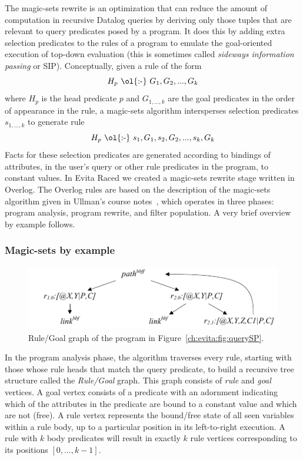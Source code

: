 The magic-sets rewrite is an optimization that can reduce the amount of computation in 
recursive Datalog queries by deriving only those tuples that are relevant to query predicates 
posed by a program. It does this by adding extra selection predicates to the rules of a program 
to emulate the goal-oriented execution of top-down evaluation (this is sometimes called 
\emph{sideways information passing} or SIP). Conceptually, given a rule of the form
\[
H_p \ \text{\ol{:-}}\  G_1, G_2, ..., G_k
\]
where $H_p$ is the head predicate $p$ and $G_{1,...,k}$ are the goal
predicates in the order of appearance in the rule, a magic-sets
algorithm intersperses selection predicates $s_{1,...,k}$ to generate rule
\[
H_p \ \text{\ol{:-}}\  s_1, G_1, s_2, G_2, ..., s_{k}, G_k
\]
Facts for these selection predicates are generated according to bindings of
attributes, in the user's query or other rule predicates in the program, to
constant values. In Evita Raced we created a magic-sets rewrite stage written in
Overlog. The Overlog rules are based on the description of the magic-sets algorithm
given in Ullman's course notes~\cite{ullmanNotes}, which operates in three phases: program analysis,
program rewrite, and filter population. A very brief overview by example follows.

\subsubsection{Magic-sets by example}

\begin{figure}[!t]
\begin{center}
\includegraphics[scale=1.8]{figures/RuleGoalGraph}
\caption{Rule/Goal graph of the program in Figure~\ref{ch:evita:fig:querySP}.}
\label{ch:evita:fig:rggraph}
\end{center}
\end{figure}

In the program analysis phase, the algorithm traverses every rule,
starting with those whose rule heads that match the query predicate, to build
a recursive tree structure called the {\em Rule/Goal} graph. This graph consists 
of \emph{rule} and \emph{goal} vertices.  A goal vertex consists of a predicate 
with an adornment indicating which of the attributes in the predicate are bound 
to a constant value and which are not (free).  A rule vertex represents the bound/free 
state of all seen variables within a rule body, up to a particular position in its left-to-right 
execution. A rule with $k$ body predicates will result in exactly $k$ rule vertices 
corresponding to its positions $[0,...,k-1]$.

